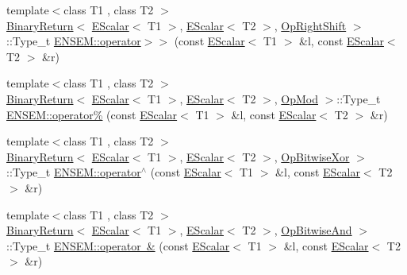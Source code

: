 \begin{DoxyCompactItemize}
\item 
{\footnotesize template$<$class T1 , class T2 $>$ }\\\mbox{\hyperlink{structENSEM_1_1BinaryReturn}{Binary\+Return}}$<$ \mbox{\hyperlink{classENSEM_1_1EScalar}{E\+Scalar}}$<$ T1 $>$, \mbox{\hyperlink{classENSEM_1_1EScalar}{E\+Scalar}}$<$ T2 $>$, \mbox{\hyperlink{structENSEM_1_1OpRightShift}{Op\+Right\+Shift}} $>$\+::Type\+\_\+t \mbox{\hyperlink{group__escalar_gacaa61f35659a0336281352bbdbef1112}{E\+N\+S\+E\+M\+::operator$>$$>$}} (const \mbox{\hyperlink{classENSEM_1_1EScalar}{E\+Scalar}}$<$ T1 $>$ \&l, const \mbox{\hyperlink{classENSEM_1_1EScalar}{E\+Scalar}}$<$ T2 $>$ \&r)
\item 
{\footnotesize template$<$class T1 , class T2 $>$ }\\\mbox{\hyperlink{structENSEM_1_1BinaryReturn}{Binary\+Return}}$<$ \mbox{\hyperlink{classENSEM_1_1EScalar}{E\+Scalar}}$<$ T1 $>$, \mbox{\hyperlink{classENSEM_1_1EScalar}{E\+Scalar}}$<$ T2 $>$, \mbox{\hyperlink{structENSEM_1_1OpMod}{Op\+Mod}} $>$\+::Type\+\_\+t \mbox{\hyperlink{group__escalar_ga970051624cd8616f50a03dcaa2fdc4db}{E\+N\+S\+E\+M\+::operator\%}} (const \mbox{\hyperlink{classENSEM_1_1EScalar}{E\+Scalar}}$<$ T1 $>$ \&l, const \mbox{\hyperlink{classENSEM_1_1EScalar}{E\+Scalar}}$<$ T2 $>$ \&r)
\item 
{\footnotesize template$<$class T1 , class T2 $>$ }\\\mbox{\hyperlink{structENSEM_1_1BinaryReturn}{Binary\+Return}}$<$ \mbox{\hyperlink{classENSEM_1_1EScalar}{E\+Scalar}}$<$ T1 $>$, \mbox{\hyperlink{classENSEM_1_1EScalar}{E\+Scalar}}$<$ T2 $>$, \mbox{\hyperlink{structENSEM_1_1OpBitwiseXor}{Op\+Bitwise\+Xor}} $>$\+::Type\+\_\+t \mbox{\hyperlink{group__escalar_ga61ae38c220aff90c4be30fbab0974540}{E\+N\+S\+E\+M\+::operator$^\wedge$}} (const \mbox{\hyperlink{classENSEM_1_1EScalar}{E\+Scalar}}$<$ T1 $>$ \&l, const \mbox{\hyperlink{classENSEM_1_1EScalar}{E\+Scalar}}$<$ T2 $>$ \&r)
\item 
{\footnotesize template$<$class T1 , class T2 $>$ }\\\mbox{\hyperlink{structENSEM_1_1BinaryReturn}{Binary\+Return}}$<$ \mbox{\hyperlink{classENSEM_1_1EScalar}{E\+Scalar}}$<$ T1 $>$, \mbox{\hyperlink{classENSEM_1_1EScalar}{E\+Scalar}}$<$ T2 $>$, \mbox{\hyperlink{structENSEM_1_1OpBitwiseAnd}{Op\+Bitwise\+And}} $>$\+::Type\+\_\+t \mbox{\hyperlink{group__escalar_ga445352dd6ecea4dcb57bfd1abcda2a0b}{E\+N\+S\+E\+M\+::operator \&}} (const \mbox{\hyperlink{classENSEM_1_1EScalar}{E\+Scalar}}$<$ T1 $>$ \&l, const \mbox{\hyperlink{classENSEM_1_1EScalar}{E\+Scalar}}$<$ T2 $>$ \&r)

\end{DoxyCompactItemize}
